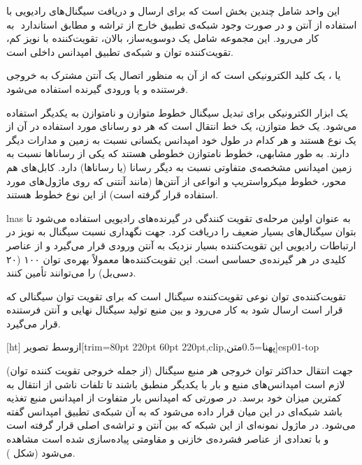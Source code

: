 
این واحد شامل چندین بخش است که برای ارسال و دریافت سیگنال‌های رادیویی با استفاده از آنتن و در صورت وجود شبکه‌ی تطبیق خارج از تراشه و مطابق استاندارد ‌ به کار می‌رود. این مجموعه شامل یک دوسویه‌ساز، بالان، تقویت‌کننده با نویز کم، تقویت‌کننده توان  و شبکه‌ی تطبیق امپدانس داخلی است.

 یا 
، یک کلید الکترونیکی است که از آن به منظور اتصال یک آنتن مشترک به خروجی فرستنده و یا ورودی گیرنده استفاده می‌شود.

یک ابزار الکترونیکی برای تبدیل سیگنال خطوط متوازن و نامتوازن به یکدیگر استفاده می‌شود. یک خط متوازن، یک خط انتقال است که هر دو رسانای مورد استفاده در آن از یک نوع هستند و هر کدام در طول خود امپدانس یکسانی نسبت به زمین و مدارات دیگر دارند. به طور مشابهی، خطوط نامتوازن خطوطی هستند که یکی از رساناها نسبت به زمین امپدانس مشخصه‌ی متفاوتی نسبت به دیگر رسانا (یا رساناها) دارد. کابل‌های هم محور، خطوط میکرواستریپ و انواعی از آنتن‌ها (مانند آنتنی که روی ماژول‌های  مورد استفاده قرار گرفته است) از این نوع خطوط هستند.

\glspl{lna}
 به عنوان اولین مرحله‌ی تقویت کنندگی در گیرنده‌های رادیویی استفاده می‌شود تا بتوان سیگنال‌های بسیار ضعیف را دریافت کرد. جهت نگهداری نسبت سیگنال به نویز در ارتباطات رادیویی این تقویت‌کننده بسیار نزدیک به آنتن ورودی قرار می‌گیرد و از عناصر کلیدی در هر گیرنده‌ی حساسی است. این تقویت‌کننده‌ها معمولاً بهره‌ی توان ۱۰۰ (۲۰ دسی‌بل) را می‌توانند تأمین کنند.

تقویت‌کننده‌ی توان  نوعی تقویت‌کننده سیگنال است که برای تقویت توان سیگنالی که قرار است ارسال شود به کار می‌رود و بین منبع تولید سیگنال نهایی و آنتن فرستنده قرار می‌گیرد.

[ht]
‌ازوسط
‌تصویر[trim={80pt 220pt 60pt 220pt},clip,پهنا=0.5‌متن]{esp01-top}

جهت انتقال حداکثر توان خروجی هر منبع سیگنال (از جمله خروجی تقویت کننده توان) لازم است امپدانس‌های منبع و بار با یکدیگر منطبق باشند تا تلفات ناشی از انتقال به کمترین میزان خود برسد. در صورتی که امپدانس بار متفاوت از امپدانس منبع تغذیه باشد شبکه‌ای در این میان قرار داده می‌شود که به آن شبکه‌ی تطبیق امپدانس گفته می‌شود. در ماژول  نمونه‌ای از این شبکه که بین آنتن و تراشه‌ی اصلی قرار گرفته است و با تعدادی از عناصر فشرده‌ی خازنی و مقاومتی پیاده‌سازی شده است مشاهده می‌شود (شکل ).

